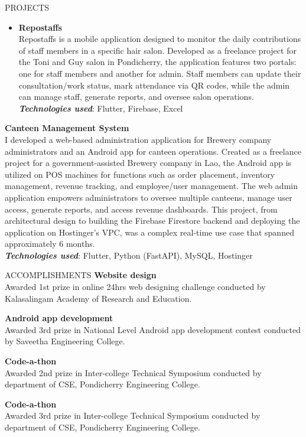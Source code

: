 \documentclass{template}
\begin{document}
\begin{rSection}{PROJECTS}
\begin{itemize}
\item \textbf{Repostaffs} \\ 
Repostaffs is a mobile application designed to monitor the daily contributions of staff members in a specific hair salon. Developed as a freelance project for the Toni and Guy salon in Pondicherry, the application features two portals: one for staff members and another for admin. Staff members can update their consultation/work status, mark attendance via QR codes, while the admin can manage staff, generate reports, and oversee salon operations. \\
\textbf{\textit{Technologies used}}: Flutter, Firebase, Excel

\end{itemize}

\textbf{Canteen Management System} \\
I developed a web-based administration application for Brewery company administrators and an Android app for canteen operations. Created as a freelance project for a government-assisted Brewery company in Lao, the Android app is utilized on POS machines for functions such as order placement, inventory management, revenue tracking, and employee/user management. The web admin application empowers administrators to oversee multiple canteens, manage user access, generate reports, and access revenue dashboards. This project, from architectural design to building the Firebase Firestore backend and deploying the application on Hostinger's VPC, was a complex real-time use case that spanned approximately 6 months. \\
\textbf{\textit{Technologies used}}: Flutter, Python (FastAPI), MySQL, Hostinger

\end{rSection}

\begin{rSection}{ACCOMPLISHMENTS}
\textbf{Website design} \\
Awarded 1st prize in online 24hrs web designing challenge conducted by Kalasalingam Academy of Research and Education.

\textbf{Android app development} \\
Awarded 3rd prize in National Level Android app development contest conducted by Saveetha Engineering College.

\textbf{Code-a-thon} \\
Awarded 2nd prize in Inter-college Technical Symposium conducted by department of CSE, Pondicherry Engineering College.

\textbf{Code-a-thon} \\
Awarded 3rd prize in Inter-college Technical Symposium conducted by department of CSE, Pondicherry Engineering College.

\end{rSection}
\end{document}
